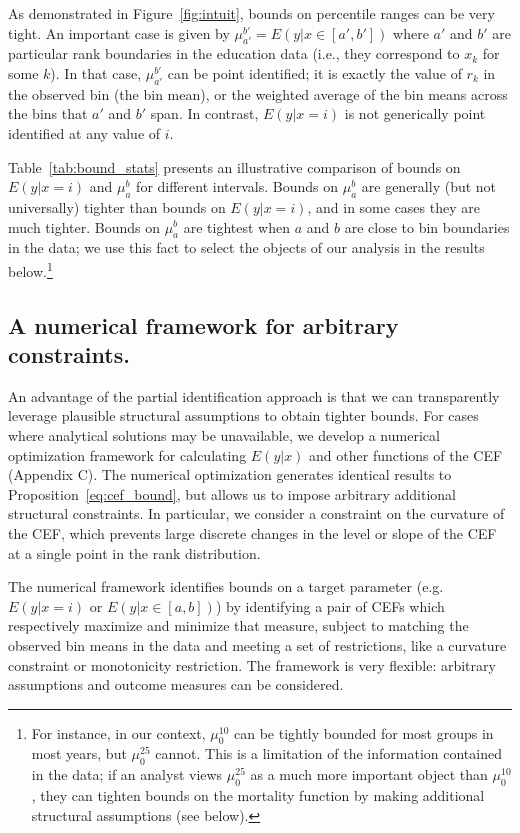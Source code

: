 \documentclass[12pt,letterpaper]{article}
\numberwithin{equation}{section}
\begin{document}
As demonstrated in Figure~\ref{fig:intuit}, bounds on percentile ranges can be very
tight. An important case is given by $\mu_{a'}^{b'} = E(y|x \in
[a',b'])$ where $a'$ and $b'$ are particular rank boundaries in the education
data (i.e., they correspond to $x_k$ for some $k$). In that case, $\mu_{a'}^{b'}$ can be point identified; it is exactly
the value of $r_k$ in the observed bin (the bin mean), or the weighted average of the
bin means across the bins that $a'$ and $b'$ span. In contrast,
$E(y|x=i)$ is not generically point identified at any value of $i$.

Table~\ref{tab:bound_stats} presents an illustrative comparison of bounds on $E(y|x=i)$ and $\mu_a^b$ for different intervals. Bounds on $\mu_a^b$ are generally (but not universally) tighter than bounds on $E(y|x=i)$, and in some cases they are much tighter. Bounds on $\mu_a^b$ are tightest when $a$ and $b$ are close to bin boundaries in the data; we use this fact to select the objects of our analysis in the results below.\footnote{For instance, in our context, $\mu_0^{10}$ can be tightly bounded for most groups in most years, but $\mu_0^{25}$ cannot. This is a limitation of the information contained in the data; if an analyst views $\mu_0^{25}$ as a much more important object than $\mu_0^{10}$, they can tighten bounds on the mortality function by making additional structural assumptions (see below).}

\subsection{A numerical framework for arbitrary constraints.}
An advantage of the partial identification approach is that we can transparently leverage plausible structural assumptions to obtain tighter bounds. For cases where analytical solutions may be unavailable, we develop a numerical optimization framework for calculating $E(y|x)$ and other functions of the CEF (Appendix C). The numerical optimization generates identical results to Proposition~\ref{eq:cef_bound}, but allows us to impose arbitrary additional structural constraints. In particular, we consider a constraint on the curvature of the CEF, which prevents large discrete changes in the level or slope of the CEF at a single point in the rank distribution.

The numerical framework identifies bounds on a target parameter (e.g. $E(y|x=i)$ or $E(y|x \in [a,b])$) by identifying a pair of CEFs which respectively maximize and minimize that measure, subject to matching the observed bin means in the data and meeting a set of restrictions, like a curvature constraint or monotonicity restriction. The framework is very flexible: arbitrary assumptions and outcome measures can be considered.
\end{document}
